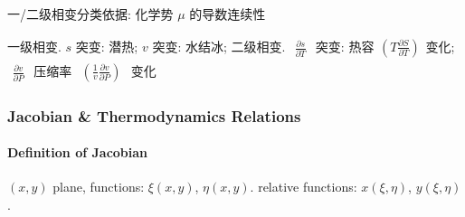 \documentclass[../../main.tex]{subfiles}
\begin{document}
一/二级相变分类依据: 化学势 $\mu$ 的导数连续性

一级相变. $s$ 突变: 潜热; $v$ 突变: 水结冰; 二级相变. $\begin{aligned}
    \frac{\partial s}{\partial T}
\end{aligned}$ 突变: 热容$\begin{aligned}
    \left(T\frac{\partial S}{\partial T}\right)
\end{aligned}$变化; $\begin{aligned}
    \frac{\partial v}{\partial P}
\end{aligned}$ 压缩率 $\begin{aligned}
    \left(\frac{1}{v}\frac{\partial v}{\partial P}\right)
\end{aligned}$ 变化

\subsubsection{Jacobian \& Thermodynamics Relations}
\paragraph{Definition of Jacobian}

$(x,y)$ plane, functions: $\xi(x,y)$, $\eta(x,y)$. relative functions: $x(\xi, \eta)$, $y(\xi, \eta)$.
\end{document}

